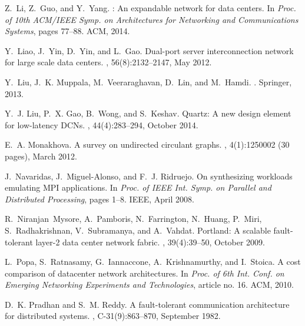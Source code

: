 \documentclass[]{amsart}
\begin{document}
\begin{thebibliography}{10}
Z.~Li, Z.~Guo, and Y.~Yang.
: An expandable network for data centers.
\newblock In {\em Proc. of 10th ACM/IEEE Symp. on Architectures for Networking
  and Communications Systems}, pages 77--88. ACM, 2014.

Y.~Liao, J.~Yin, D.~Yin, and L.~Gao.
 {D}ual-port server interconnection network for large scale
  data centers.
, 56(8):2132--2147, May 2012.

Y.~Liu, J.~K. Muppala, M.~Veeraraghavan, D.~Lin, and M.~Hamdi.
.
\newblock Springer, 2013.

Y.~J. Liu, P.~X. Gao, B.~Wong, and S.~Keshav.
\newblock Quartz: A new design element for low-latency {DCN}s.
, 44(4):283--294, October
  2014.

E.~A. Monakhova.
\newblock A survey on undirected circulant graphs.
, 4(1):1250002
  (30 pages), March 2012.

J.~Navaridas, J.~Miguel-Alonso, and F.~J. Ridruejo.
\newblock On synthesizing workloads emulating {MPI} applications.
\newblock In {\em Proc. of IEEE Int. Symp. on Parallel and Distributed
  Processing}, pages 1--8. IEEE, April 2008.

R.~Niranjan~Mysore, A.~Pamboris, N.~Farrington, N.~Huang, P.~Miri,
  S.~Radhakrishnan, V.~Subramanya, and A.~Vahdat.
\newblock Portland: A scalable fault-tolerant layer-2 data center network
  fabric.
, 39(4):39--50, October
  2009.

L.~Popa, S.~Ratnasamy, G.~Iannaccone, A.~Krishnamurthy, and I.~Stoica.
\newblock A cost comparison of datacenter network architectures.
\newblock In {\em Proc. of 6th Int. Conf. on Emerging Networking Experiments
  and Technologies}, article no. 16. ACM, 2010.

D.~K. Pradhan and S.~M. Reddy.
\newblock A fault-tolerant communication architecture for distributed systems.
, C-31(9):863--870, September
  1982.


\end{thebibliography}
\end{document}
